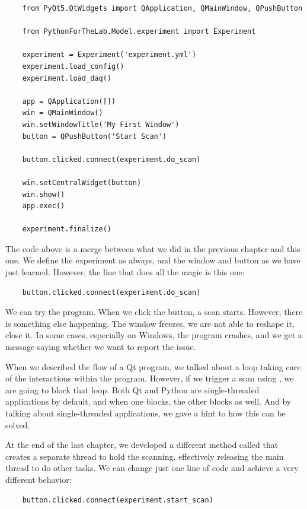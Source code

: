 \begin{verbatim}
    from PyQt5.QtWidgets import QApplication, QMainWindow, QPushButton

    from PythonForTheLab.Model.experiment import Experiment

    experiment = Experiment('experiment.yml')
    experiment.load_config()
    experiment.load_daq()

    app = QApplication([])
    win = QMainWindow()
    win.setWindowTitle('My First Window')
    button = QPushButton('Start Scan')

    button.clicked.connect(experiment.do_scan)

    win.setCentralWidget(button)
    win.show()
    app.exec()

    experiment.finalize()
\end{verbatim}

The code above is a merge between what we did in the previous chapter and this one. We define the experiment as always, and the window and button as we have just learned. However, the line that does all the magic is this one:

\begin{verbatim}
    button.clicked.connect(experiment.do_scan)
\end{verbatim}

We can try the program. When we click the button, a scan starts. However, there is something else happening. The window freezes, we are not able to reshape it, close it. In some cases, especially on Windows, the program crashes, and we get a message saying whether we want to report the issue.


When we described the flow of a Qt program, we talked about a loop taking care of the interactions within the program. However, if we trigger a scan using , we are going to block that loop. Both Qt and Python are single-threaded applications by default, and when one blocks, the other blocks as well. And by talking about single-threaded applications, we gave a hint to how this can be solved.

At the end of the last chapter, we developed a different method called  that creates a separate thread to hold the scanning, effectively releasing the main thread to do other tasks. We can change just one line of code and achieve a very different behavior:

\begin{verbatim}
    button.clicked.connect(experiment.start_scan)
\end{verbatim}

